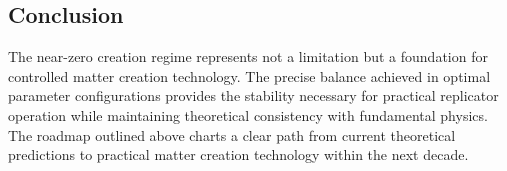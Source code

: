 \documentclass[11pt]{article}
\begin{document}
\subsection*{Conclusion}

The near-zero creation regime represents not a limitation but a foundation for controlled matter creation technology. The precise balance achieved in optimal parameter configurations provides the stability necessary for practical replicator operation while maintaining theoretical consistency with fundamental physics. The roadmap outlined above charts a clear path from current theoretical predictions to practical matter creation technology within the next decade.
\end{document}
